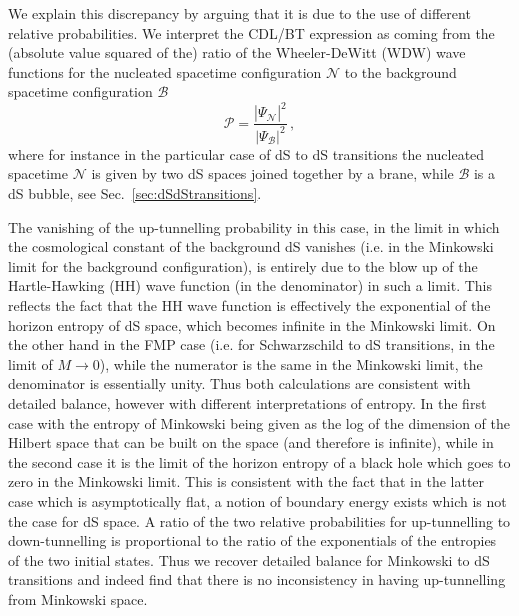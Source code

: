 \documentclass[11pt,a4paper]{article}
\begin{document}
We explain this discrepancy by arguing that it is due to the use of different relative probabilities. We interpret the CDL/BT expression as coming from the (absolute value squared of the) ratio of the Wheeler-DeWitt (WDW) wave functions for the nucleated spacetime configuration $\mathcal{N}$ to the background spacetime configuration $\mathcal{B}$
\begin{equation}
\label{eq:RelativeProbability}
\mathcal{P} = \frac{\left|\Psi_{\mathcal{N}}\right|^2}{\left|\Psi_{\mathcal{B}}\right|^2} \,,
\end{equation}
where for instance in the particular case of dS to dS transitions the nucleated spacetime $\mathcal{N}$ is given by two dS spaces joined together by a brane, while $\mathcal{B}$ is a dS bubble, see Sec.~\ref{sec:dSdStransitions}.

The vanishing of the up-tunnelling probability in this case, in the limit in which the cosmological constant of the background dS vanishes (i.e. in the Minkowski limit for the background configuration), is entirely due to the blow up of the Hartle-Hawking (HH) wave function (in the denominator) in such a limit. This reflects the fact that the HH wave function is effectively the exponential of the horizon entropy of dS space, which becomes infinite in the Minkowski limit. On the other hand in the FMP case (i.e. for Schwarzschild to dS transitions, in the limit of $M \rightarrow 0$), while the numerator is the same in the Minkowski limit, the denominator is essentially unity. Thus both calculations are consistent with detailed balance, however with different interpretations of entropy. In the first case with the entropy of Minkowski being  given as the log of the dimension of the Hilbert space that can be built on  the space (and therefore is infinite), while in the second case it is the limit of the horizon entropy of a black hole which goes to zero in the Minkowski limit. This is consistent with the fact that in the latter case which is asymptotically flat, a notion of boundary energy exists which is not the case for dS space. A ratio of the two relative probabilities for up-tunnelling to down-tunnelling is proportional to the ratio of the  exponentials of the entropies of the two initial states. Thus we recover detailed balance for Minkowski to dS transitions and indeed find that there is no inconsistency in having up-tunnelling from Minkowski space.
\end{document}
